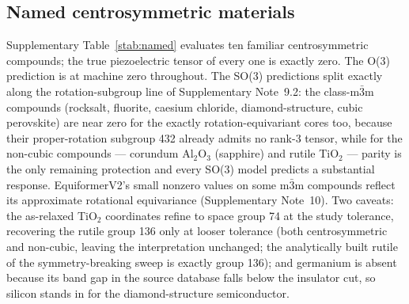 \subsection*{Named centrosymmetric materials}

Supplementary Table~\ref{stab:named} evaluates ten familiar centrosymmetric compounds; the true piezoelectric tensor of every one is exactly zero. The O(3) prediction is at machine zero throughout. The SO(3) predictions split exactly along the rotation-subgroup line of Supplementary Note~9.2: the class-m$\bar 3$m compounds (rocksalt, fluorite, caesium chloride, diamond-structure, cubic perovskite) are near zero for the exactly rotation-equivariant cores too, because their proper-rotation subgroup 432 already admits no rank-3 tensor, while for the non-cubic compounds --- corundum Al$_2$O$_3$ (sapphire) and rutile TiO$_2$ --- parity is the only remaining protection and every SO(3) model predicts a substantial response. EquiformerV2's small nonzero values on some m$\bar 3$m compounds reflect its approximate rotational equivariance (Supplementary Note~10). Two caveats: the as-relaxed TiO$_2$ coordinates refine to space group 74 at the study tolerance, recovering the rutile group 136 only at looser tolerance (both centrosymmetric and non-cubic, leaving the interpretation unchanged; the analytically built rutile of the symmetry-breaking sweep is exactly group 136); and germanium is absent because its band gap in the source database falls below the insulator cut, so silicon stands in for the diamond-structure semiconductor.

